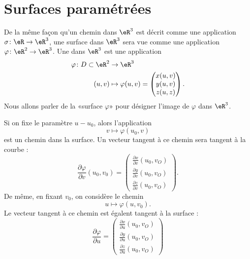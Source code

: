
\section{Surfaces paramétrées}

De la même façon qu'un chemin dans $\eR^3$ est décrit comme une application $\sigma\colon \eR\to \eR^3$, une surface dans $\eR^3$ sera vue comme une application $\varphi\colon \eR^2\to \eR^3$. Une  dans $\eR^3$ est une application
\begin{equation}
	\begin{aligned}
		\varphi\colon D\subset\eR^2 & \to \eR^3                                       \\
		(u,v)                       & \mapsto \varphi(u,v)=\begin{pmatrix}
			x(u,v) \\
			y(u,v) \\
			z(u,z)
		\end{pmatrix}.
	\end{aligned}
\end{equation}
Nous allons parler de la «surface $\varphi$» pour désigner l'image de $\varphi$ dans $\eR^3$.

Si on fixe le paramètre $u-u_0$, alors l'application
\begin{equation}
	v\mapsto\varphi(u_0,v)
\end{equation}
est un chemin dans la surface. Un vecteur tangent à ce chemin sera tangent à la courbe :
\begin{equation}
	\frac{ \partial \varphi }{ \partial v }(u_0,v_0)=
	\begin{pmatrix}
		\frac{ \partial x }{ \partial v }(u_0,v_O) \\
		\frac{ \partial y }{ \partial v }(u_0,v_O) \\
		\frac{ \partial z }{ \partial v }(u_0,v_O)
	\end{pmatrix}.
\end{equation}
De même, en fixant $v_0$, on considère le chemin
\begin{equation}
	u\mapsto\varphi(u,v_0).
\end{equation}
Le vecteur tangent à ce chemin est égalent tangent à la surface :
\begin{equation}
	\frac{ \partial \varphi }{ \partial u }=
	\begin{pmatrix}
		\frac{ \partial x }{ \partial u }(u_0,v_O) \\
		\frac{ \partial y }{ \partial u }(u_0,v_O) \\
		\frac{ \partial z }{ \partial u }(u_0,v_O)
	\end{pmatrix}
\end{equation}


